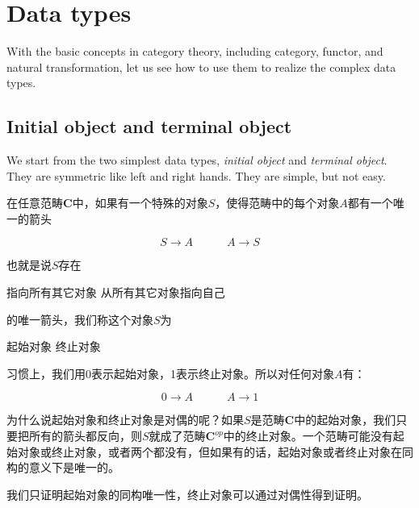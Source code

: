 \documentclass{article}
\begin{document}
\section{Data types}

With the basic concepts in category theory, including category, functor, and natural transformation, let us see how to use them to realize the complex data types.

\subsection{Initial object and terminal object}
We start from the two simplest data types, {\em initial object} and {\em terminal object}. They are symmetric like left and right hands. They are simple, but not easy.

 
\begin{definition}
在任意范畴$\pmb{C}$中，如果有一个特殊的对象$S$，使得范畴中的每个对象$A$都有一个唯一的箭头

\[
  S \longrightarrow A \quad \quad \quad A \longrightarrow S
\]

也就是说$S$存在

\begin{center}
  指向所有其它对象  \quad \quad \quad 从所有其它对象指向自己
\end{center}
的唯一箭头，我们称这个对象$S$为

\begin{center}
  起始对象 \quad \quad \quad 终止对象
\end{center}
\end{definition}

习惯上，我们用0表示起始对象，1表示终止对象。所以对任何对象$A$有：

\[
  0 \longrightarrow A \quad \quad \quad A \longrightarrow 1
\]

为什么说起始对象和终止对象是对偶的呢？如果$S$是范畴$\pmb{C}$中的起始对象，我们只要把所有的箭头都反向，则$S$就成了范畴$\pmb{C}^{op}$中的终止对象。一个范畴可能没有起始对象或终止对象，或者两个都没有，但如果有的话，起始对象或者终止对象在同构的意义下是唯一的。

我们只证明起始对象的同构唯一性，终止对象可以通过对偶性得到证明。
\end{document}

